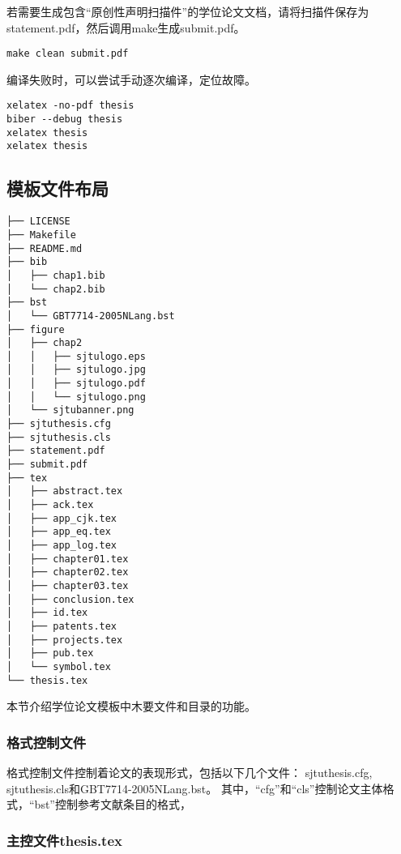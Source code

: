 若需要生成包含“原创性声明扫描件”的学位论文文档，请将扫描件保存为statement.pdf，然后调用make生成submit.pdf。

\begin{lstlisting}[basicstyle=\small\ttfamily, caption={生成用于提交的学位论文}, numbers=none]
make clean submit.pdf
\end{lstlisting}

编译失败时，可以尝试手动逐次编译，定位故障。

\begin{lstlisting}[basicstyle=\small\ttfamily, caption={手动逐次编译}, numbers=none]
xelatex -no-pdf thesis
biber --debug thesis
xelatex thesis
xelatex thesis
\end{lstlisting}

\subsection{模板文件布局}
\label{sec:layout}

\begin{lstlisting}[basicstyle=\small\ttfamily,caption={模板文件布局},label=layout,float,numbers=none]
├── LICENSE
├── Makefile
├── README.md
├── bib
│   ├── chap1.bib
│   └── chap2.bib
├── bst
│   └── GBT7714-2005NLang.bst
├── figure
│   ├── chap2
│   │   ├── sjtulogo.eps
│   │   ├── sjtulogo.jpg
│   │   ├── sjtulogo.pdf
│   │   └── sjtulogo.png
│   └── sjtubanner.png
├── sjtuthesis.cfg
├── sjtuthesis.cls
├── statement.pdf
├── submit.pdf
├── tex
│   ├── abstract.tex
│   ├── ack.tex
│   ├── app_cjk.tex
│   ├── app_eq.tex
│   ├── app_log.tex
│   ├── chapter01.tex
│   ├── chapter02.tex
│   ├── chapter03.tex
│   ├── conclusion.tex
│   ├── id.tex
│   ├── patents.tex
│   ├── projects.tex
│   ├── pub.tex
│   └── symbol.tex
└── thesis.tex
\end{lstlisting}

本节介绍学位论文模板中木要文件和目录的功能。

\subsubsection{格式控制文件}
\label{sec:format}

格式控制文件控制着论文的表现形式，包括以下几个文件：
sjtuthesis.cfg, sjtuthesis.cls和GBT7714-2005NLang.bst。
其中，“cfg”和“cls”控制论文主体格式，“bst”控制参考文献条目的格式，

\subsubsection{主控文件thesis.tex}
\label{sec:thesistex}


